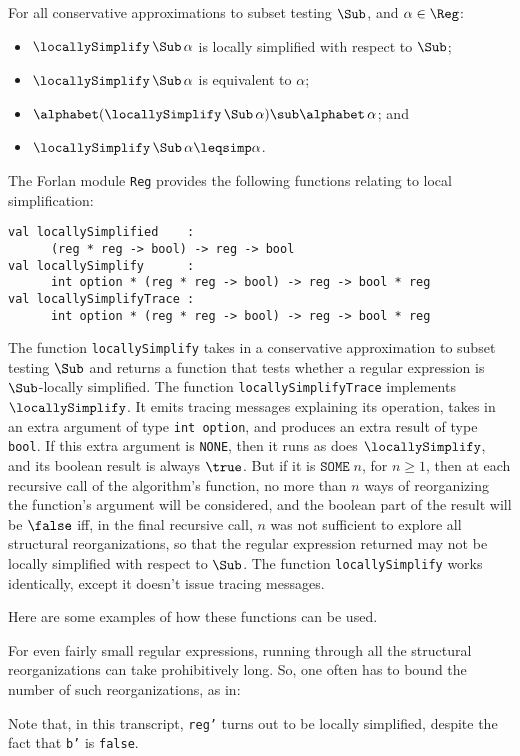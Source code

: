 \begin{theorem}
For all conservative approximations to subset testing $\Sub$,
and $\alpha\in\Reg$:
\begin{itemize}
\item $\locallySimplify\,\Sub\,\alpha$ is locally simplified with
  respect to $\Sub$;

\item $\locallySimplify\,\Sub\,\alpha$ is equivalent to $\alpha$;

\item $\alphabet(\locallySimplify\,\Sub\,\alpha)\sub\alphabet\,\alpha$;
  and

\item $\locallySimplify\,\Sub\,\alpha\leqsimp\alpha$.
\end{itemize}
\end{theorem}

The Forlan module \texttt{Reg} provides the following functions
relating to local simplification:
\begin{verbatim}
val locallySimplified    :
      (reg * reg -> bool) -> reg -> bool
val locallySimplify      :
      int option * (reg * reg -> bool) -> reg -> bool * reg
val locallySimplifyTrace :
      int option * (reg * reg -> bool) -> reg -> bool * reg
\end{verbatim}
The function \texttt{locallySimplify} takes in a conservative
approximation to subset testing $\Sub$ and returns a function that
tests whether a regular expression is $\Sub$-locally simplified.  The
function \texttt{locallySimplifyTrace} implements $\locallySimplify$.
It emits tracing messages explaining its operation, takes in an extra
argument of type \texttt{int~option}, and produces an extra result of
type \texttt{bool}.  If this extra argument is \texttt{NONE}, then it
runs as does $\locallySimplify$, and its boolean result is always
$\true$.  But if it is $\mathtt{SOME}\;n$, for $n\geq 1$, then at each
recursive call of the algorithm's function, no more than $n$ ways of
reorganizing the function's argument will be considered, and the
boolean part of the result will be $\false$ iff, in the final
recursive call, $n$ was not sufficient to explore all structural
reorganizations, so that the regular expression returned may not be
locally simplified with respect to $\Sub$.  The function
\texttt{locallySimplify} works identically, except it doesn't issue
tracing messages.

Here are some examples of how these functions can be used.

For even fairly small regular expressions, running through all the
structural reorganizations can take prohibitively long.  So, one
often has to bound the number of such reorganizations, as in:

Note that, in this transcript, \texttt{reg'} turns out to be
locally simplified, despite the fact that \texttt{b'} is \texttt{false}.

